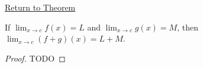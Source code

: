 \newpage
{}
\label{prf:sum-rule-function-limits}

\begin{remark*}[Return]
\hyperref[thm:sum-rule-function-limits]{Return to Theorem}
\end{remark*}

\begin{theorem*}
If $\lim_{x\to c}f(x)=L$ and $\lim_{x\to c}g(x)=M$, then $\lim_{x\to c}(f+g)(x)=L+M$.
\end{theorem*}

\begin{proof}
TODO
\end{proof}
